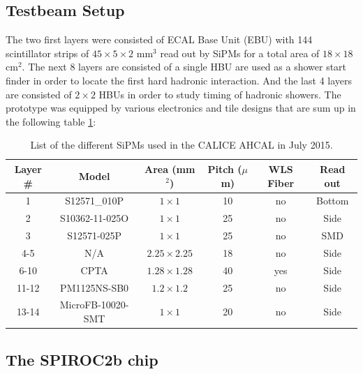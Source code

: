 \documentclass[twoside,a4paper,11pt]{article}
\begin{document}
\subsection{Testbeam Setup}

The two first layers were consisted of ECAL Base Unit (EBU) with 144 scintillator strips of $45\times5\times2$ mm$^3$ read out by SiPMs for a total area of $18\times18$ cm$^2$. The next 8 layers are consisted of a single HBU are used as a shower start finder in order to locate the first hard hadronic interaction. And the last 4 layers are consisted of $2\times2$ HBUs in order to study timing of hadronic showers. The prototype was equipped by various electronics and tile designs that are sum up in the following table \ref{table:sipm_list}:
\begin{table}[htbp]
\centering
    \begin{tabular}{@{} cccccc @{}}
    \hline
    Layer \# & Model & Area (mm$^2$) & Pitch ($\mu$m) & WLS Fiber & Read out \\ \hline
    1 & S12571\_010P & $1\times1$ & 10 & no & Bottom \\ 
    2 & S10362-11-025O & $1\times1$ & 25 & no & Side \\
    3 & S12571-025P & $1\times1$ & 25 & no & SMD \\ 
    4-5 & N/A & $2.25\times2.25$ & 18 & no & Side \\
    6-10 & CPTA & $1.28\times1.28$ & 40 & yes & Side \\ 
    11-12 & PM1125NS-SB0 & $1.2\times1.2$ & 25 & no & Side \\
    13-14 & MicroFB-10020-SMT & $1\times1$ & 20 & no & Side \\
    \hline
    \end{tabular}
     \caption{List of the different SiPMs used in the CALICE AHCAL in July 2015.}
     \label{table:sipm_list}
\end{table}
\subsection{The SPIROC2b chip}
\end{document}
